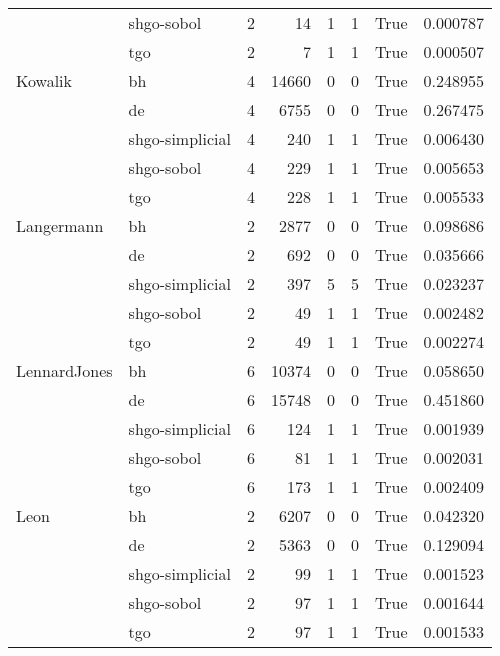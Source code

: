 \begin{longtable}{llrrrrlr}
         & shgo-sobol &     2 &       14 &      1 &       1 &    True &    0.000787 \\
         & tgo &     2 &        7 &      1 &       1 &    True &    0.000507 \\
Kowalik & bh &     4 &    14660 &      0 &       0 &    True &    0.248955 \\
         & de &     4 &     6755 &      0 &       0 &    True &    0.267475 \\
         & shgo-simplicial &     4 &      240 &      1 &       1 &    True &    0.006430 \\
         & shgo-sobol &     4 &      229 &      1 &       1 &    True &    0.005653 \\
         & tgo &     4 &      228 &      1 &       1 &    True &    0.005533 \\
Langermann & bh &     2 &     2877 &      0 &       0 &    True &    0.098686 \\
         & de &     2 &      692 &      0 &       0 &    True &    0.035666 \\
         & shgo-simplicial &     2 &      397 &      5 &       5 &    True &    0.023237 \\
         & shgo-sobol &     2 &       49 &      1 &       1 &    True &    0.002482 \\
         & tgo &     2 &       49 &      1 &       1 &    True &    0.002274 \\
LennardJones & bh &     6 &    10374 &      0 &       0 &    True &    0.058650 \\
         & de &     6 &    15748 &      0 &       0 &    True &    0.451860 \\
         & shgo-simplicial &     6 &      124 &      1 &       1 &    True &    0.001939 \\
         & shgo-sobol &     6 &       81 &      1 &       1 &    True &    0.002031 \\
         & tgo &     6 &      173 &      1 &       1 &    True &    0.002409 \\
Leon & bh &     2 &     6207 &      0 &       0 &    True &    0.042320 \\
         & de &     2 &     5363 &      0 &       0 &    True &    0.129094 \\
         & shgo-simplicial &     2 &       99 &      1 &       1 &    True &    0.001523 \\
         & shgo-sobol &     2 &       97 &      1 &       1 &    True &    0.001644 \\
         & tgo &     2 &       97 &      1 &       1 &    True &    0.001533 \\

\end{longtable}
